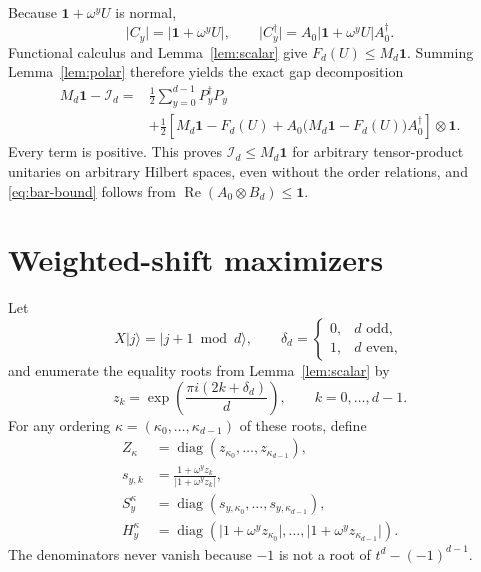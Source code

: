 \documentclass[11pt]{article}
\theoremstyle{remark}
\newcommand{\Id}{\mathbf 1}
\newcommand{\cI}{\mathcal I}
\newcommand{\Reop}{\operatorname{Re}}
\newcommand{\absop}[1]{\lvert #1\rvert}
\begin{document}
Because \(\Id+\omega^yU\) is normal,
\[
  \absop{C_y}=\absop{\Id+\omega^yU},\qquad
  \absop{C_y^\dagger}
  =A_0\absop{\Id+\omega^yU}A_0^\dagger.
\]
Functional calculus and Lemma~\ref{lem:scalar} give
\(F_d(U)\leq M_d\Id\).  Summing Lemma~\ref{lem:polar} therefore yields the
exact gap decomposition
\begin{equation}
\boxed{
\begin{aligned}
 M_d\Id-\cI_d
 ={}&\frac12\sum_{y=0}^{d-1}P_y^\dagger P_y\\
 &+\frac12\left[
 M_d\Id-F_d(U)
 +A_0\bigl(M_d\Id-F_d(U)\bigr)A_0^\dagger
 \right]\otimes\Id.
\end{aligned}}
\label{eq:gap}
\end{equation}
Every term is positive.  This proves
\(\cI_d\leq M_d\Id\) for arbitrary tensor-product unitaries on arbitrary
Hilbert spaces, even without the order relations, and
\eqref{eq:bar-bound} follows from
\(\Reop(A_0\otimes B_d)\leq\Id\).

\section{Weighted-shift maximizers}\label{sec:family}

Let
\[
  X\lvert j\rangle=\lvert j+1\bmod d\rangle,\qquad
  \delta_d=\begin{cases}0,&d\text{ odd},\\1,&d\text{ even},\end{cases}
\]
and enumerate the equality roots from Lemma~\ref{lem:scalar} by
\begin{equation}
  z_k=\exp\!\left(\frac{\pi i(2k+\delta_d)}d\right),
  \qquad k=0,\ldots,d-1.
  \label{eq:zk}
\end{equation}
For any ordering
\(\kappa=(\kappa_0,\ldots,\kappa_{d-1})\) of these roots, define
\begin{align*}
 Z_\kappa&=\operatorname{diag}
 (z_{\kappa_0},\ldots,z_{\kappa_{d-1}}),\\
 s_{y,k}&=\frac{1+\omega^yz_k}{\lvert1+\omega^yz_k\rvert},\\
 S_y^\kappa&=\operatorname{diag}
 (s_{y,\kappa_0},\ldots,s_{y,\kappa_{d-1}}),\\
 H_y^\kappa&=\operatorname{diag}
 (\lvert1+\omega^yz_{\kappa_0}\rvert,\ldots,
  \lvert1+\omega^yz_{\kappa_{d-1}}\rvert).
\end{align*}
The denominators never vanish because \(-1\) is not a root of
\(t^d-(-1)^{d-1}\).
\end{document}
